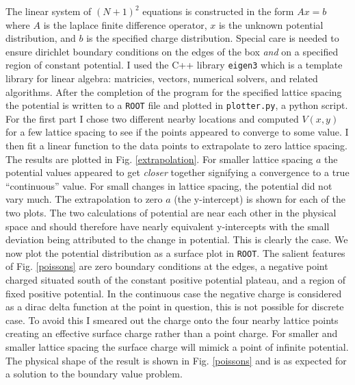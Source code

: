\documentclass[singlepage,notitlepage,nofootinbib,11pt]{revtex4-1}
\begin{document}
The linear system of $(N+1)^2$ equations is constructed in the form $Ax=b$ where $A$ is the laplace finite difference operator, $x$ is the unknown potential distribution, and $b$ is the specified charge distribution. Special care is needed to ensure dirichlet boundary conditions on the edges of the box {\it and} on a specified region of constant potential. I used the C++ library \texttt{eigen3} which is a template library for linear algebra: matricies, vectors, numerical solvers, and related algorithms. After the completion of the program for the specified lattice spacing the potential is written to a \texttt{ROOT} file and plotted in \texttt{plotter.py}, a python script. For the first part I chose two different nearby locations and computed $V(x,y)$ for a few lattice spacing to see if the points appeared to converge to some value. I then fit a linear function to the data points to extrapolate to zero lattice spacing. The results are plotted in Fig. \ref{extrapolation}. For smaller lattice spacing $a$ the potential values appeared to get {\it closer} together signifying a convergence to a true ``continuous'' value. For small changes in lattice spacing, the potential did not vary much. The extrapolation to zero $a$ (the y-intercept) is shown for each of the two plots.  The two calculations of potential are near each other in the physical space and should therefore have nearly equivalent y-intercepts with the small deviation being attributed to the change in potential. This is clearly the case. We now plot the potential distribution as a surface plot in \texttt{ROOT}. The salient features of Fig. \ref{poissons} are zero boundary conditions at the edges, a negative point charged situated south of the constant positive potential plateau, and a region of fixed positive potential. In the continuous case the negative charge is considered as a dirac delta function at the point in question, this is not possible for discrete case. To avoid this I smeared out the charge onto the four nearby lattice points creating an effective surface charge rather than a point charge. For smaller and smaller lattice spacing the surface charge will mimick a point of infinite potential. The physical shape of the result is shown in Fig. \ref{poissons} and is as expected for a solution to the boundary value problem.
\end{document}
